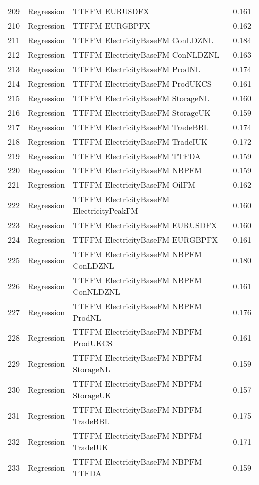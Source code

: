 \begin{table}[ht]
\begin{tabular}{rllr}
  209 & Regression & TTFFM EURUSDFX & 0.161 \\ 
  210 & Regression & TTFFM EURGBPFX & 0.162 \\ 
  211 & Regression & TTFFM ElectricityBaseFM ConLDZNL & 0.184 \\ 
  212 & Regression & TTFFM ElectricityBaseFM ConNLDZNL & 0.163 \\ 
  213 & Regression & TTFFM ElectricityBaseFM ProdNL & 0.174 \\ 
  214 & Regression & TTFFM ElectricityBaseFM ProdUKCS & 0.161 \\ 
  215 & Regression & TTFFM ElectricityBaseFM StorageNL & 0.160 \\ 
  216 & Regression & TTFFM ElectricityBaseFM StorageUK & 0.159 \\ 
  217 & Regression & TTFFM ElectricityBaseFM TradeBBL & 0.174 \\ 
  218 & Regression & TTFFM ElectricityBaseFM TradeIUK & 0.172 \\ 
  219 & Regression & TTFFM ElectricityBaseFM TTFDA & 0.159 \\ 
  220 & Regression & TTFFM ElectricityBaseFM NBPFM & 0.159 \\ 
  221 & Regression & TTFFM ElectricityBaseFM OilFM & 0.162 \\ 
  222 & Regression & TTFFM ElectricityBaseFM ElectricityPeakFM & 0.160 \\ 
  223 & Regression & TTFFM ElectricityBaseFM EURUSDFX & 0.160 \\ 
  224 & Regression & TTFFM ElectricityBaseFM EURGBPFX & 0.161 \\ 
  225 & Regression & TTFFM ElectricityBaseFM NBPFM ConLDZNL & 0.180 \\ 
  226 & Regression & TTFFM ElectricityBaseFM NBPFM ConNLDZNL & 0.161 \\ 
  227 & Regression & TTFFM ElectricityBaseFM NBPFM ProdNL & 0.176 \\ 
  228 & Regression & TTFFM ElectricityBaseFM NBPFM ProdUKCS & 0.161 \\ 
  229 & Regression & TTFFM ElectricityBaseFM NBPFM StorageNL & 0.159 \\ 
  230 & Regression & TTFFM ElectricityBaseFM NBPFM StorageUK & 0.157 \\ 
  231 & Regression & TTFFM ElectricityBaseFM NBPFM TradeBBL & 0.175 \\ 
  232 & Regression & TTFFM ElectricityBaseFM NBPFM TradeIUK & 0.171 \\ 
  233 & Regression & TTFFM ElectricityBaseFM NBPFM TTFDA & 0.159 \\ 

\end{tabular}
\end{table}
